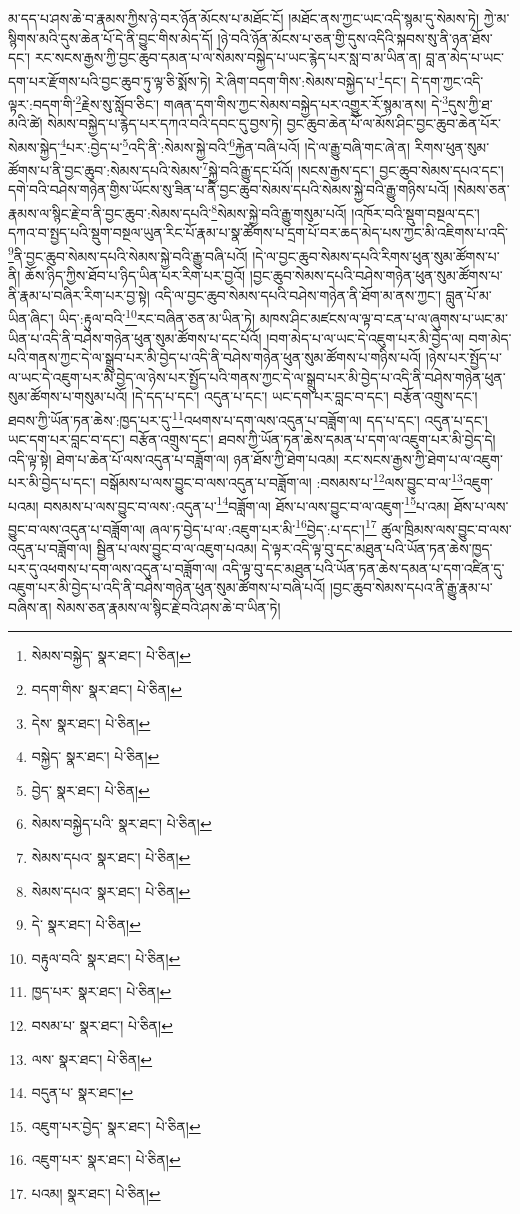 མ་དད་པ་ཤས་ཆེ་བ་རྣམས་ཀྱིས་ཉེ་བར་ཉོན་མོངས་པ་མཐོང་ངོ། །མཐོང་ནས་ཀྱང་ཡང་འདི་སྙམ་དུ་སེམས་ཏེ། ཀྱེ་མ་སྙིགས་མའི་དུས་ཆེན་པོ་དེ་ནི་བྱུང་གིས་མེད་དོ། །ཉེ་བའི་ཉོན་མོངས་པ་ཅན་གྱི་དུས་འདིའི་སྐབས་སུ་ནི་ཉན་ཐོས་དང་། རང་སངས་རྒྱས་ཀྱི་བྱང་ཆུབ་དམན་པ་ལ་སེམས་བསྐྱེད་པ་ཡང་རྙེད་པར་སླ་བ་མ་ཡིན་ན། བླ་ན་མེད་པ་ཡང་དག་པར་རྫོགས་པའི་བྱང་ཆུབ་ཏུ་ལྟ་ཅི་སྨོས་ཏེ། རེ་ཞིག་བདག་གིས་:སེམས་བསྐྱེད་པ་\footnote{སེམས་བསྐྱེད་  སྣར་ཐང་།  པེ་ཅིན། }དང་། དེ་དག་ཀྱང་འདི་ལྟར་:བདག་གི་\footnote{བདག་གིས་  སྣར་ཐང་།  པེ་ཅིན། }རྗེས་སུ་སློབ་ཅིང་། གཞན་དག་གིས་ཀྱང་སེམས་བསྐྱེད་པར་འགྱུར་རོ་སྙམ་ནས། དེ་\footnote{དེས་  སྣར་ཐང་།  པེ་ཅིན། }དུས་ཀྱི་ཐ་མའི་ཚེ། སེམས་བསྐྱེད་པ་རྙེད་པར་དཀའ་བའི་དབང་དུ་བྱས་ཏེ། བྱང་ཆུབ་ཆེན་པོ་ལ་མོས་ཤིང་བྱང་ཆུབ་ཆེན་པོར་སེམས་སྐྱེད་\footnote{བསྐྱེད་  སྣར་ཐང་།  པེ་ཅིན། }པར་:བྱེད་པ་\footnote{བྱེད་  སྣར་ཐང་།  པེ་ཅིན། }འདི་ནི་:སེམས་སྐྱེ་བའི་\footnote{སེམས་བསྐྱེད་པའི་  སྣར་ཐང་།  པེ་ཅིན། }རྐྱེན་བཞི་པའོ། །དེ་ལ་རྒྱུ་བཞི་གང་ཞེ་ན། རིགས་ཕུན་སུམ་ཚོགས་པ་ནི་བྱང་ཆུབ་:སེམས་དཔའི་སེམས་\footnote{སེམས་དཔའ་  སྣར་ཐང་།  པེ་ཅིན། }སྐྱེ་བའི་རྒྱུ་དང་པོའོ། །སངས་རྒྱས་དང་། བྱང་ཆུབ་སེམས་དཔའ་དང་། དགེ་བའི་བཤེས་གཉེན་གྱིས་ཡོངས་སུ་ཟིན་པ་ནི་བྱང་ཆུབ་སེམས་དཔའི་སེམས་སྐྱེ་བའི་རྒྱུ་གཉིས་པའོ། །སེམས་ཅན་རྣམས་ལ་སྙིང་རྗེ་བ་ནི་བྱང་ཆུབ་:སེམས་དཔའི་\footnote{སེམས་དཔའ་  སྣར་ཐང་།  པེ་ཅིན། }སེམས་སྐྱེ་བའི་རྒྱུ་གསུམ་པའོ། །འཁོར་བའི་སྡུག་བསྔལ་དང་། དཀའ་བ་སྤྱད་པའི་སྡུག་བསྔལ་ཡུན་རིང་པོ་རྣམ་པ་སྣ་ཚོགས་པ་དྲག་པོ་བར་ཆད་མེད་པས་ཀྱང་མི་འཇིགས་པ་འདི་\footnote{དེ་  སྣར་ཐང་།  པེ་ཅིན། }ནི་བྱང་ཆུབ་སེམས་དཔའི་སེམས་སྐྱེ་བའི་རྒྱུ་བཞི་པའོ། །དེ་ལ་བྱང་ཆུབ་སེམས་དཔའི་རིགས་ཕུན་སུམ་ཚོགས་པ་ནི། ཆོས་ཉིད་ཀྱིས་ཐོབ་པ་ཉིད་ཡིན་པར་རིག་པར་བྱའོ། །བྱང་ཆུབ་སེམས་དཔའི་བཤེས་གཉེན་ཕུན་སུམ་ཚོགས་པ་ནི་རྣམ་པ་བཞིར་རིག་པར་བྱ་སྟེ། འདི་ལ་བྱང་ཆུབ་སེམས་དཔའི་བཤེས་གཉེན་ནི་ཐོག་མ་ནས་ཀྱང་། བླུན་པོ་མ་ཡིན་ཞིང་། ཡིད་:རྟུལ་བའི་\footnote{བརྟུལ་བའི་  སྣར་ཐང་།  པེ་ཅིན། }རང་བཞིན་ཅན་མ་ཡིན་ཏེ། མཁས་ཤིང་མཛངས་ལ་ལྟ་བ་ངན་པ་ལ་ཞུགས་པ་ཡང་མ་ཡིན་པ་འདི་ནི་བཤེས་གཉེན་ཕུན་སུམ་ཚོགས་པ་དང་པོའོ། །བག་མེད་པ་ལ་ཡང་དེ་འཇུག་པར་མི་བྱེད་ལ། བག་མེད་པའི་གནས་ཀྱང་དེ་ལ་སྒྲུབ་པར་མི་བྱེད་པ་འདི་ནི་བཤེས་གཉེན་ཕུན་སུམ་ཚོགས་པ་གཉིས་པའོ། །ཉེས་པར་སྤྱོད་པ་ལ་ཡང་དེ་འཇུག་པར་མི་བྱེད་ལ་ཉེས་པར་སྤྱོད་པའི་གནས་ཀྱང་དེ་ལ་སྒྲུབ་པར་མི་བྱེད་པ་འདི་ནི་བཤེས་གཉེན་ཕུན་སུམ་ཚོགས་པ་གསུམ་པའོ། །དེ་དད་པ་དང་། འདུན་པ་དང་། ཡང་དག་པར་བླང་བ་དང་། བརྩོན་འགྲུས་དང་། ཐབས་ཀྱི་ཡོན་ཏན་ཆེས་:ཁྱད་པར་དུ་\footnote{ཁྱད་པར་  སྣར་ཐང་།  པེ་ཅིན། }འཕགས་པ་དག་ལས་འདུན་པ་བཟློག་ལ། དད་པ་དང་། འདུན་པ་དང་། ཡང་དག་པར་བླང་བ་དང་། བརྩོན་འགྲུས་དང་། ཐབས་ཀྱི་ཡོན་ཏན་ཆེས་དམན་པ་དག་ལ་འཇུག་པར་མི་བྱེད་དེ། འདི་ལྟ་སྟེ། ཐེག་པ་ཆེན་པོ་ལས་འདུན་པ་བཟློག་ལ། ཉན་ཐོས་ཀྱི་ཐེག་པའམ། རང་སངས་རྒྱས་ཀྱི་ཐེག་པ་ལ་འཇུག་པར་མི་བྱེད་པ་དང་། བསྒོམས་པ་ལས་བྱུང་བ་ལས་འདུན་པ་བཟློག་ལ། :བསམས་པ་\footnote{བསམ་པ་  སྣར་ཐང་།  པེ་ཅིན། }ལས་བྱུང་བ་ལ་\footnote{ལས་  སྣར་ཐང་།  པེ་ཅིན། }འཇུག་པའམ། བསམས་པ་ལས་བྱུང་བ་ལས་:འདུན་པ་\footnote{བདུན་པ་  སྣར་ཐང་། }བཟློག་ལ། ཐོས་པ་ལས་བྱུང་བ་ལ་འཇུག་\footnote{འཇུག་པར་བྱེད་  སྣར་ཐང་།  པེ་ཅིན། }པ་འམ། ཐོས་པ་ལས་བྱུང་བ་ལས་འདུན་པ་བཟློག་ལ། ཞལ་ཏ་བྱེད་པ་ལ་:འཇུག་པར་མི་\footnote{འཇུག་པར་  སྣར་ཐང་།  པེ་ཅིན། }བྱེད་:པ་དང་།\footnote{པའམ།  སྣར་ཐང་།  པེ་ཅིན། } ཚུལ་ཁྲིམས་ལས་བྱུང་བ་ལས་འདུན་པ་བཟློག་ལ། སྦྱིན་པ་ལས་བྱུང་བ་ལ་འཇུག་པའམ། དེ་ལྟར་འདི་ལྟ་བུ་དང་མཐུན་པའི་ཡོན་ཏན་ཆེས་ཁྱད་པར་དུ་འཕགས་པ་དག་ལས་འདུན་པ་བཟློག་ལ། འདི་ལྟ་བུ་དང་མཐུན་པའི་ཡོན་ཏན་ཆེས་དམན་པ་དག་འཛིན་དུ་འཇུག་པར་མི་བྱེད་པ་འདི་ནི་བཤེས་གཉེན་ཕུན་སུམ་ཚོགས་པ་བཞི་པའོ། །བྱང་ཆུབ་སེམས་དཔའ་ནི་རྒྱུ་རྣམ་པ་བཞིས་ན། སེམས་ཅན་རྣམས་ལ་སྙིང་རྗེ་བའི་ཤས་ཆེ་བ་ཡིན་ཏེ། 